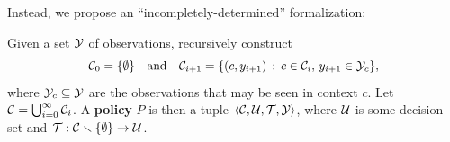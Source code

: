 \begin{example}
\begin{figure}[h]
\begin{floatrow}
\quad
{}\quad\quad
{}
\end{floatrow}
\end{figure}
\end{example}
Instead, we propose an ``incompletely-determined'' formalization:
\begin{definition}[Policies]
Given a set $\mathcal{Y}$ of observations, recursively construct
\begin{equation}
\mathcal{C}_0 = \{\emptyset\}\quad\text{and}\quad\mathcal{C}_{i+1} = \{(c,y_{i+1})\,:\,c\in\mathcal{C}_i,\, y_{i+1}\in\mathcal{Y}_c\},
\end{equation}
where $\mathcal{Y}_c\subseteq\mathcal{Y}$ are the observations that may be seen in context $c$.  
Let $\mathcal{C} = \bigcup_{i=0}^{\infty}\mathcal{C}_i$.
A \textbf{policy} $P$ is then a tuple $\left\langle\mathcal{C}, \mathcal{U}, \mathcal{T}, \mathcal{Y}\right\rangle$, 
where $\mathcal{U}$ is some decision set and $\mathcal{T}:\mathcal{C}\smallsetminus\{\emptyset\}\to\mathcal{U}$.
\end{definition}
